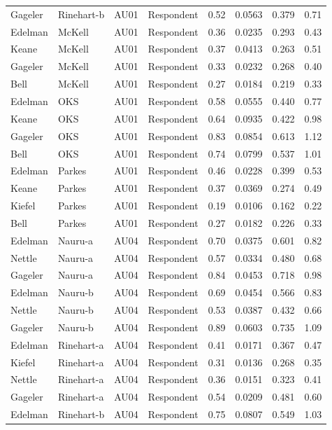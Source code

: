 \documentclass{monashthesis}
\begin{document}
\begin{center}
\begin{longtable}{llllllll}
Gageler & Rinehart-b & AU01 & Respondent & 0.52 & 0.0563 & 0.379 & 0.71 \\
Edelman & McKell & AU01 & Respondent & 0.36 & 0.0235 & 0.293 & 0.43 \\
Keane & McKell & AU01 & Respondent & 0.37 & 0.0413 & 0.263 & 0.51 \\
Gageler & McKell & AU01 & Respondent & 0.33 & 0.0232 & 0.268 & 0.40 \\
Bell & McKell & AU01 & Respondent & 0.27 & 0.0184 & 0.219 & 0.33 \\
Edelman & OKS & AU01 & Respondent & 0.58 & 0.0555 & 0.440 & 0.77 \\
Keane & OKS & AU01 & Respondent & 0.64 & 0.0935 & 0.422 & 0.98 \\
Gageler & OKS & AU01 & Respondent & 0.83 & 0.0854 & 0.613 & 1.12 \\
Bell & OKS & AU01 & Respondent & 0.74 & 0.0799 & 0.537 & 1.01 \\
Edelman & Parkes & AU01 & Respondent & 0.46 & 0.0228 & 0.399 & 0.53 \\
Keane & Parkes & AU01 & Respondent & 0.37 & 0.0369 & 0.274 & 0.49 \\
Kiefel & Parkes & AU01 & Respondent & 0.19 & 0.0106 & 0.162 & 0.22 \\
Bell & Parkes & AU01 & Respondent & 0.27 & 0.0182 & 0.226 & 0.33 \\
Edelman & Nauru-a & AU04 & Respondent & 0.70 & 0.0375 & 0.601 & 0.82 \\
Nettle & Nauru-a & AU04 & Respondent & 0.57 & 0.0334 & 0.480 & 0.68 \\
Gageler & Nauru-a & AU04 & Respondent & 0.84 & 0.0453 & 0.718 & 0.98 \\
Edelman & Nauru-b & AU04 & Respondent & 0.69 & 0.0454 & 0.566 & 0.83 \\
Nettle & Nauru-b & AU04 & Respondent & 0.53 & 0.0387 & 0.432 & 0.66 \\
Gageler & Nauru-b & AU04 & Respondent & 0.89 & 0.0603 & 0.735 & 1.09 \\
Edelman & Rinehart-a & AU04 & Respondent & 0.41 & 0.0171 & 0.367 & 0.47 \\
Kiefel & Rinehart-a & AU04 & Respondent & 0.31 & 0.0136 & 0.268 & 0.35 \\
Nettle & Rinehart-a & AU04 & Respondent & 0.36 & 0.0151 & 0.323 & 0.41 \\
Gageler & Rinehart-a & AU04 & Respondent & 0.54 & 0.0209 & 0.481 & 0.60 \\
Edelman & Rinehart-b & AU04 & Respondent & 0.75 & 0.0807 & 0.549 & 1.03 \\

\end{longtable}
\end{center}
\end{document}
